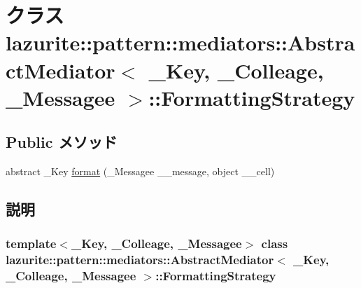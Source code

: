 \hypertarget{classlazurite_1_1pattern_1_1mediators_1_1_abstract_mediator_3_01___key_00_01___colleage_00_01___05d0f5dbbad2bc6db18831464bc366e3}{
\section{クラス lazurite::pattern::mediators::AbstractMediator$<$ \_\-Key, \_\-Colleage, \_\-Messagee $>$::FormattingStrategy}
\label{classlazurite_1_1pattern_1_1mediators_1_1_abstract_mediator_3_01___key_00_01___colleage_00_01___05d0f5dbbad2bc6db18831464bc366e3}
}
\subsection*{Public メソッド}
\begin{DoxyCompactItemize}
\item 
abstract \_\-Key \hyperlink{classlazurite_1_1pattern_1_1mediators_1_1_abstract_mediator_3_01___key_00_01___colleage_00_01___05d0f5dbbad2bc6db18831464bc366e3_a5425830bd9719992ac7d8ea159fccab2}{format} (\_\-Messagee \_\-\_\-message, object \_\-\_\-cell)
\end{DoxyCompactItemize}


\subsection{説明}
\subsubsection*{template$<$\_\-Key, \_\-Colleage, \_\-Messagee$>$ class lazurite::pattern::mediators::AbstractMediator$<$ \_\-Key, \_\-Colleage, \_\-Messagee $>$::FormattingStrategy}



